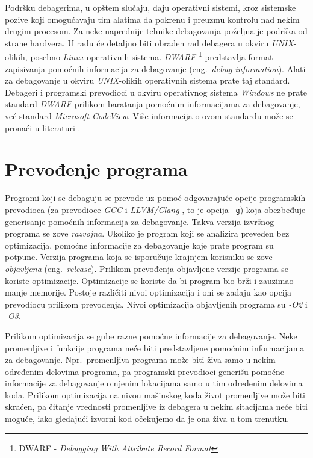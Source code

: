 \documentclass[12pt,oneside]{memoir}
\begin{document}
Podršku debagerima, u opštem slučaju, daju operativni sistemi, kroz sistemske pozive koji omogućavaju tim alatima da pokrenu i preuzmu kontrolu nad nekim drugim procesom. Za neke naprednije tehnike debagovanja poželjna je podrška od strane hardvera. U radu će detaljno biti obrađen rad debagera u okviru \emph{UNIX}-olikih, posebno \emph{Linux} operativnih sistema. \emph{DWARF} \footnote{DWARF - \emph{Debugging With Attribute Record Format}}\cite{DWARF} predstavlja format zapisivanja pomoćnih informacija za debagovanje (eng.~\emph{debug information}). Alati za debagovanje u okviru \emph{UNIX}-olikih operativnih sistema prate taj standard. Debageri i programski prevodioci u okviru operativnog sistema \emph{Windows} ne prate standard \emph{DWARF} prilikom baratanja pomoćnim informacijama za debagovanje, već standard \emph{Microsoft CodeView}. Više informacija o ovom standardu može se pronaći u literaturi \cite{CodeView}.

\section{Prevođenje programa}

Programi koji se debaguju se prevode uz pomoć odgovarajuće opcije programskih prevodioca (za prevodioce \emph{GCC} \cite{GCC} i \emph{LLVM/Clang} \cite{LLVM}, to je opcija \texttt{-g}) koja obezbeđuje generisanje pomoćnih informacija za debagovanje. Takva verzija izvršnog programa se zove \emph{razvojna}. Ukoliko je program koji se analizira preveden bez optimizacija, pomoćne informacije za debagovanje koje prate program su potpune. Verzija programa koja se isporučuje krajnjem korisniku se zove \emph{objavljena} (eng.~\emph{release}). Prilikom prevođenja objavljene verzije programa se koriste optimizacije. Optimizacije se koriste da bi program bio brži i zauzimao manje memorije. Postoje različiti nivoi optimizacija i oni se zadaju kao opcija prevodiocu prilikom prevođenja. Nivoi optimizacija objavljenih programa su \emph{-O2} i \emph{-O3}.

Prilikom optimizacija se gube razne pomoćne informacije za debagovanje. Neke promenljive i funkcije programa neće biti predstavljene pomoćnim informacijama za debagovanje. Npr.~promenljiva programa može biti živa samo u nekim određenim delovima programa, pa programski prevodioci generišu pomoćne informacije za debagovanje o njenim lokacijama samo u tim određenim delovima koda. Prilikom optimizacija na nivou mašinskog koda život promenljive može biti skraćen, pa čitanje vrednosti promenljive iz debagera u nekim sitacijama neće biti moguće, iako gledajući izvorni kod očekujemo da je ona živa u tom trenutku.
\end{document}
